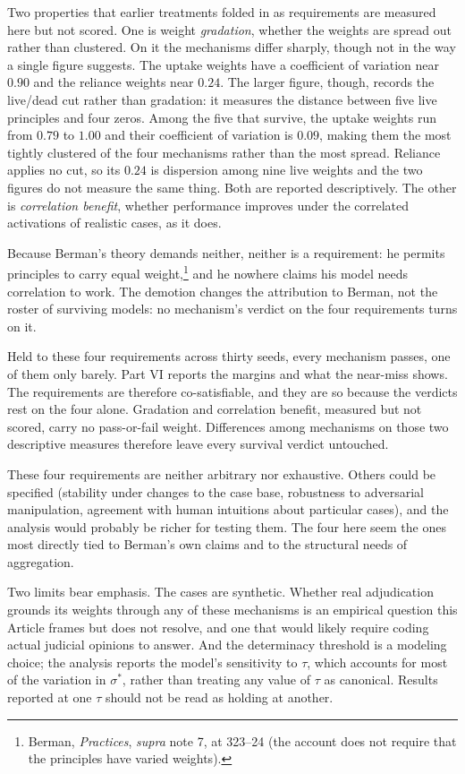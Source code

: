 Two properties that earlier treatments folded in as requirements are
measured here but not scored. One is weight \textit{gradation}, whether the weights are spread out rather
than clustered. On it the mechanisms differ sharply, though not in the way a
single figure suggests. The uptake weights have a coefficient of variation
near $0.90$ and the reliance weights near $0.24$. The larger figure,
though, records the live/dead cut rather than gradation: it measures the
distance between five live principles and four zeros. Among the five that
survive, the uptake weights run from $0.79$ to $1.00$ and their coefficient of
variation is $0.09$, making them the most tightly clustered of the four
mechanisms rather than the most spread. Reliance applies no cut, so its $0.24$
is dispersion among nine live weights and the two figures do not measure the
same thing. Both are reported descriptively.
The other is \textit{correlation benefit}, whether performance improves under
the correlated activations of realistic cases, as it does.

Because Berman's theory demands neither, neither is a requirement: he
permits principles to carry equal weight,\footnote{Berman, \textit{Practices},
\textit{supra} note 7, at 323--24 (the account does not require that the
principles have varied weights).} and he nowhere claims his model needs
correlation to work. The demotion changes the attribution to Berman, not the
roster of surviving models: no mechanism's verdict on the four requirements
turns on it.

Held to these four requirements across thirty seeds, every mechanism
passes, one of them only barely. Part VI reports the margins and what the
near-miss shows. The requirements are therefore co-satisfiable, and they
are so because the verdicts rest on the four alone. Gradation and
correlation benefit, measured but not scored, carry no pass-or-fail weight.
Differences among mechanisms on those two descriptive measures therefore
leave every survival verdict untouched.

These four requirements are neither arbitrary nor exhaustive. Others could
be specified (stability under changes to the case base, robustness to
adversarial manipulation, agreement with human intuitions about particular
cases), and the analysis would probably be richer for testing them. The four here seem the ones most directly tied to Berman's own claims and to
the structural needs of aggregation.

Two limits bear emphasis. The cases
are synthetic. Whether real adjudication grounds its weights through any of
these mechanisms is an empirical question this Article frames but does not
resolve, and one that would likely require coding actual judicial opinions
to answer.
And the determinacy threshold is a modeling choice; the analysis reports
the model's sensitivity to $\tau$, which
accounts for most of the variation in $\sigma^{*}$, rather than treating any value of $\tau$ as canonical. Results reported at
one $\tau$ should not be read as holding at another.

